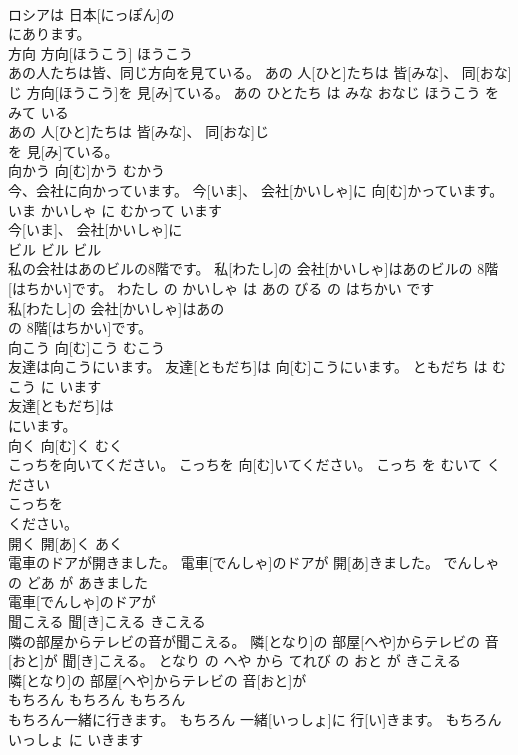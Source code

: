 \documentclass[8pt]{extreport}
\begin{document}
\begin{CJK}{UTF8}{min}
\\	ロシアは 日本[にっぽん]の
\\	にあります。			
\\	方向	方向[ほうこう]	ほうこう	
\\	あの人たちは皆、同じ方向を見ている。	あの 人[ひと]たちは 皆[みな]、 同[おな]じ 方向[ほうこう]を 見[み]ている。	あの ひとたち は みな おなじ ほうこう を みて いる	
\\	あの 人[ひと]たちは 皆[みな]、 同[おな]じ
\\	を 見[み]ている。			
\\	向かう	向[む]かう	むかう	
\\	今、会社に向かっています。	今[いま]、 会社[かいしゃ]に 向[む]かっています。	いま かいしゃ に むかって います	
\\	今[いま]、 会社[かいしゃ]に
\\	ビル	ビル	ビル	
\\	私の会社はあのビルの8階です。	私[わたし]の 会社[かいしゃ]はあのビルの 8階[はちかい]です。	わたし の かいしゃ は あの びる の はちかい です	
\\	私[わたし]の 会社[かいしゃ]はあの
\\	の 8階[はちかい]です。			
\\	向こう	向[む]こう	むこう	
\\	友達は向こうにいます。	友達[ともだち]は 向[む]こうにいます。	ともだち は むこう に います	
\\	友達[ともだち]は
\\	にいます。			
\\	向く	向[む]く	むく	
\\	こっちを向いてください。	こっちを 向[む]いてください。	こっち を むいて ください	
\\	こっちを
\\	ください。			
\\	開く	開[あ]く	あく	
\\	電車のドアが開きました。	電車[でんしゃ]のドアが 開[あ]きました。	でんしゃ の どあ が あきました	
\\	電車[でんしゃ]のドアが
\\	聞こえる	聞[き]こえる	きこえる	
\\	隣の部屋からテレビの音が聞こえる。	隣[となり]の 部屋[へや]からテレビの 音[おと]が 聞[き]こえる。	となり の へや から てれび の おと が きこえる	
\\	隣[となり]の 部屋[へや]からテレビの 音[おと]が
\\	もちろん	もちろん	もちろん	
\\	もちろん一緒に行きます。	もちろん 一緒[いっしょ]に 行[い]きます。	もちろん いっしょ に いきます	

\end{CJK}
\end{document}
